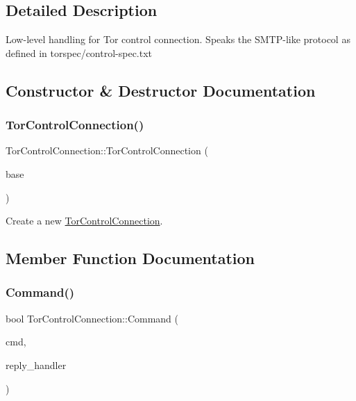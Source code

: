 \subsection{Detailed Description}
Low-\/level handling for Tor control connection. Speaks the S\+M\+T\+P-\/like protocol as defined in torspec/control-\/spec.\+txt 

\subsection{Constructor \& Destructor Documentation}
\mbox{\label{class_tor_control_connection_a5850ebb205bddf1fbc97271fae8eaf78}} 
\subsubsection{\texorpdfstring{Tor\+Control\+Connection()}{TorControlConnection()}}
{\footnotesize\ttfamily Tor\+Control\+Connection\+::\+Tor\+Control\+Connection (\begin{DoxyParamCaption}\item[{struct event\+\_\+base $\ast$}]{base }\end{DoxyParamCaption})}

Create a new \mbox{\hyperlink{class_tor_control_connection}{Tor\+Control\+Connection}}. 

\subsection{Member Function Documentation}
\mbox{\label{class_tor_control_connection_a5d0292a1389bb0f78d15fe6c06a2baeb}} 
\subsubsection{\texorpdfstring{Command()}{Command()}}
{\footnotesize\ttfamily bool Tor\+Control\+Connection\+::\+Command (\begin{DoxyParamCaption}\item[{const std\+::string \&}]{cmd,  }\item[{const Reply\+Handler\+CB \&}]{reply\+\_\+handler }\end{DoxyParamCaption})}

